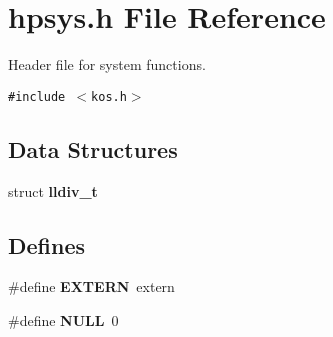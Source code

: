 \section{hpsys.h File Reference}
\label{hpsys_8h}
Header file for system functions. 


{\tt \#include $<$kos.h$>$}\par
\subsection*{Data Structures}
\begin{CompactItemize}
\item 
struct {\bf lldiv\_\-t}
\end{CompactItemize}
\subsection*{Defines}
\begin{CompactItemize}
\item 
\#define {\bf EXTERN}\ extern
\item 
\#define {\bf NULL}\ 0
\end{CompactItemize}
